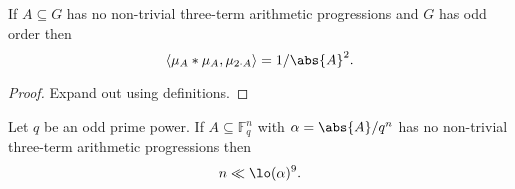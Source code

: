 \begin{lemma}
\label{no3aps_inner_prod}
\leanok
If $A\subseteq G$ has no non-trivial three-term arithmetic progressions and $G$ has odd order then
\[\langle \mu_A\ast \mu_A,\mu_{2\cdot A}\rangle = 1/\abs{A}^2.\]
\end{lemma}

\begin{proof}
\leanok
Expand out using definitions.
\end{proof}


\begin{theorem}
  \label{ff}
  \uses{}
  \leanok

  Let $q$ be an odd prime power. If $A\subseteq \mathbb{F}_q^n$ with $\alpha=\abs{A}/q^n$ has no non-trivial three-term arithmetic progressions then
  \[n \ll \lo(\alpha)^9.\]
\end{theorem}
